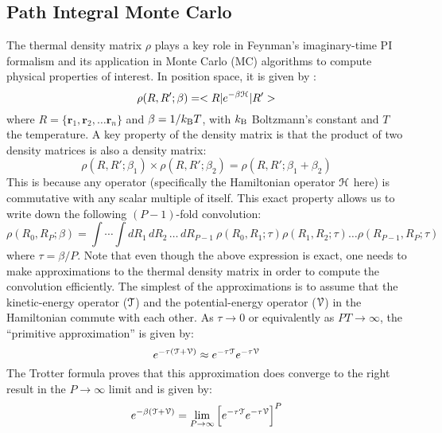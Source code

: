     \subsection{Path Integral Monte Carlo}
        The thermal density matrix $\rho$ plays a key role in Feynman's imaginary-time PI formalism and its application in Monte Carlo (MC) algorithms to compute physical properties of interest. In position space, it is given by \cite{Feynman,Ceperley1995,Cui1997}:
        \begin{equation}\label{eq:rho}
            \rho (R , R' ; \beta) = < R | e^{- \beta \mathcal{H} } | R' >
        \end{equation}
        where $R = \{\bm{r}_1, \bm{r}_2, \ldots \bm{r}_n\}$ and $\beta = 1/k_{\rm B}T$, with $k_{\rm B}$ Boltzmann's constant and $T$ the temperature. A key property of the density matrix is that the product of two density matrices is also a density matrix:
        \begin{equation}\label{eq:dmProduct}
            \rho (R, R'; \beta_1) \times \rho (R, R'; \beta_2) = \rho (R, R'; \beta_1 + \beta_2)
        \end{equation}
        This is because any operator (specifically the Hamiltonian operator $\mathcal{H}$ here) is commutative with any scalar multiple of itself. This exact property allows us to write down the following $(P-1)$-fold convolution:
        \begin{equation}\label{eq:convolution}
            \rho (R_0, R_P; \beta) = \displaystyle\int \cdots \int dR_1 \, dR_2 \, \ldots \, dR_{P-1} \: \rho (R_0, R_1; \tau) \rho (R_1, R_2; \tau) \ldots \rho (R_{P-1}, R_P; \tau)
        \end{equation}
        where $\tau = \beta/P$. Note that even though the above expression is exact, one needs to make approximations to the thermal density matrix in order to compute the convolution efficiently. The simplest of the approximations is to assume that the kinetic-energy operator ($\mathcal{T}$) and the potential-energy operator ($\mathcal{V}$) in the Hamiltonian commute with each other. As $\tau \to 0$ or equivalently as $PT \to \infty$, the ``primitive approximation'' is given by:
        \begin{equation}\label{eq:primitiveApprox}
            e^{- \tau (\mathcal{T} + \mathcal{V})} \approx e^{- \tau \mathcal{T}} e^{- \tau \mathcal{V}}
        \end{equation}
        The Trotter formula proves that this approximation does converge to the right result in the $P \to \infty$ limit and is given by:
        \begin{equation}\label{eq:trotter}
            e^{- \beta (\mathcal{T} + \mathcal{V})} = \lim_{P \to \infty} \Big[ e^{- \tau \mathcal{T}} e^{- \tau \mathcal{V}} \Big]^P
        \end{equation}


